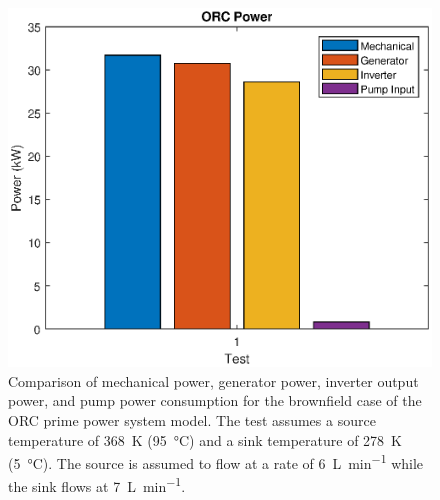 \begin{figure}[h]
	\centering

	\includegraphics[width=\textwidth]{figures/bfPower}

	\caption{Comparison of mechanical power, generator power, inverter output power, and pump power consumption for the brownfield case of the ORC prime power system model. The test assumes a source temperature of \SI{368}{\kelvin} (\SI{95}{\degreeCelsius}) and a sink temperature of \SI{278}{\kelvin} (\SI{5}{\degreeCelsius}). The source is assumed to flow at a rate of \SI{6}{\liter\per\minute} while the sink flows at \SI{7}{\liter\per\minute}. }
	\label{fig:bfPower}
\end{figure}